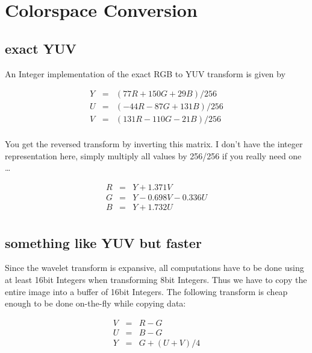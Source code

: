 
\section{ Colorspace Conversion }

\subsection{ exact YUV }

An Integer implementation of the exact RGB to YUV transform is given by 

\begin{eqnarray}
Y &=& ( 77 R + 150 G +  29 B) / 256    \nonumber\\
U &=& (-44 R -  87 G + 131 B) / 256    \nonumber\\
V &=& (131 R - 110 G -  21 B) / 256    \nonumber\\
\nonumber
\end{eqnarray}

You get the reversed transform by inverting this matrix. I don't have the 
integer representation here, simply multiply all values by 256/256 if you
really need one \dots

\begin{eqnarray}
R &=& Y + 1.371 V                      \nonumber\\
G &=& Y - 0.698 V - 0.336 U            \nonumber\\
B &=& Y + 1.732 U                      \nonumber\\
\nonumber
\end{eqnarray}

\subsection{ something like YUV but faster }

Since the wavelet transform is expansive, all computations have to be done using
at least 16bit Integers when transforming 8bit Integers. Thus we have to copy
the entire image into a buffer of 16bit Integers. The following transform is 
cheap enough to be done on-the-fly while copying data:

\begin{eqnarray}
V &=& R - G                                          \nonumber\\
U &=& B - G                                          \nonumber\\
Y &=& G + (U + V) / 4                                \nonumber\\
\nonumber
\end{eqnarray}

